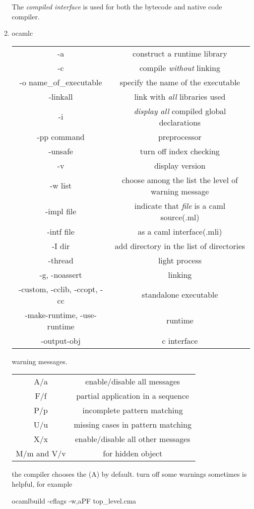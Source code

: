 \begin{enumerate}
  
  The \textit{compiled interface} is used for both the bytecode and native code compiler.

\item ocamlc \\
  
  \begin{tabular}{|c|c|}
    \hline
    -a & construct a runtime library \\
    -c & compile \textit{without} linking \\
    -o name\_of\_executable & specify the name of the executable \\
    -linkall & link with \textit{all} libraries used \\
    -i & \textit{display all } compiled global declarations \\
    -pp command & preprocessor \\
    -unsafe & turn off index checking \\
    -v & display version \\
    -w list & choose among the list the level of warning message \\
    -impl file & indicate that \textit{file} is a caml source(.ml) \\
    -intf file & as a caml interface(.mli) \\
    -I dir & add directory in the list of directories \\
    \hline
    -thread & light process \\
    -g, -noassert & linking \\
    -custom, -cclib, -ccopt, -cc & standalone executable \\
    -make-runtime, -use-runtime & runtime \\
    -output-obj & c interface \\
  \end{tabular}

  warning messages.

  \begin{tabular}{|c|c|}
    A/a & enable/disable all messages \\
    F/f & partial application in a sequence \\
    P/p & incomplete pattern matching \\
    U/u & missing cases in pattern matching \\
    X/x & enable/disable all other messages \\
    M/m and V/v & for hidden object \\
  \end{tabular}
  the compiler chooses the (A) by default.
  turn off some warnings sometimes is helpful, for example
  \begin{bluetext}
	ocamlbuild -cflags -w,aPF top_level.cma    
  \end{bluetext}


\end{enumerate}
